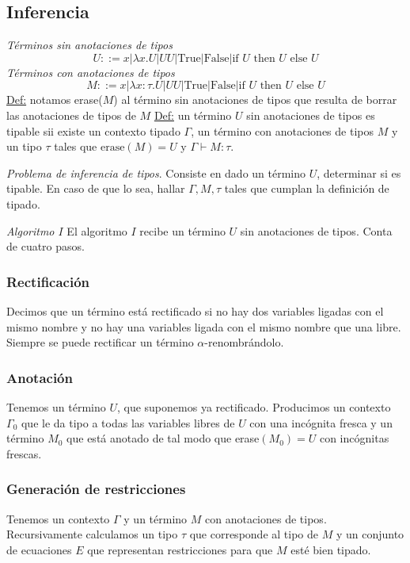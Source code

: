 \documentclass[12pt]{extarticle}
\def\definicion{\newline\underline{Def:} }
\begin{document}
\subsection{Inferencia}
\textit{Términos sin anotaciones de tipos}
$$ U ::= x | \lambda x. U | U U | \text{True} | \text{False} | \text{if } U \text{ then } U \text{ else } U $$
\textit{Términos con anotaciones de tipos}
$$ M ::= x | \lambda x: \tau. U | U U | \text{True} | \text{False} | \text{if } U \text{ then } U \text{ else } U $$
\definicion notamos erase($M$) al término sin anotaciones de tipos que resulta de borrar las anotaciones de tipos de $M$
\definicion un término $U$ sin anotaciones de tipos es tipable sii existe un contexto tipado $\Gamma$, un término con anotaciones de tipos $M$ y un tipo $\tau$ tales que $\text{erase}(M) = U$ y $\Gamma \vdash M : \tau$.

\textit{Problema de inferencia de tipos}. Consiste en dado un término $U$, determinar si es tipable. En caso de que lo sea, hallar $\Gamma, M, \tau$ tales que cumplan la definición de tipado.

\textit{Algoritmo $I$}
El algoritmo $I$ recibe un término $U$ sin anotaciones de tipos. Conta de cuatro pasos.

\subsubsection{Rectificación}
Decimos que un término está rectificado si no hay dos variables ligadas con el mismo nombre y no hay una variables ligada con el mismo nombre que una libre. Siempre se puede rectificar un término $\alpha$-renombrándolo.

\subsubsection{Anotación}
Tenemos un término $U$, que suponemos ya rectificado. Producimos un contexto $\Gamma_0$ que le da tipo a todas las variables libres de $U$ con una incógnita fresca y un término $M_0$ que está anotado de tal modo que erase$(M_0) = U$ con incógnitas frescas.

\subsubsection{Generación de restricciones}
Tenemos un contexto $\Gamma$ y un término $M$ con anotaciones de tipos. Recursivamente calculamos un tipo $\tau$ que corresponde al tipo de $M$ y un conjunto de ecuaciones $E$ que representan restricciones para que $M$ esté bien tipado.
\end{document}
